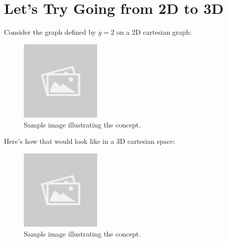 \documentclass{article}
\begin{document}
\section*{Let's Try Going from 2D to 3D}
\begin{examplebox}
Consider the graph defined by \( y = 2 \) on a 2D cartesian graph:
\begin{figure}[H]
    \centering
    \includegraphics[width=0.35\textwidth]{sample_image.jpg}
    \caption{Sample image illustrating the concept.}
    \label{fig:sample_image}
\end{figure}
Here's how that would look like in a 3D cartesian space:
\begin{figure}[H]
    \centering
    \includegraphics[width=0.35\textwidth]{sample_image.jpg}
    \caption{Sample image illustrating the concept.}
    \label{fig:sample_image}
\end{figure}
\end{examplebox}
\end{document}
